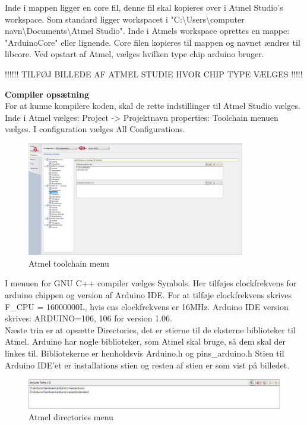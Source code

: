 Inde i mappen ligger en core fil, denne fil skal kopieres over i Atmel Studio's workspace. Som standard ligger workspacet i "C:\textbackslash Users\textbackslash computer navn\textbackslash Documents\textbackslash Atmel Studio". 
Inde i Atmels workspace oprettes en mappe: "ArduinoCore" eller lignende. Core filen kopieres til mappen og navnet ændres til libcore.
Ved opstart af Atmel, vælges hvilken type chip arduino bruger.

!!!!!! TILFØJ BILLEDE AF ATMEL STUDIE HVOR CHIP TYPE VÆLGES !!!!!

\textbf{Compiler opsætning} \\
For at kunne kompilere koden, skal de rette indstillinger til Atmel Studio vælges. 
Inde i Atmel vælges: Project -> Projektnavn properties:
Toolchain menuen vælges. I configuration vælges All Configurations.

\begin{figure}[H]
	\centering
	\includegraphics[width=0.85\textwidth]{Billeder/implementation/Howtoguide/atmel_toolchain.png}
	\caption{Atmel toolchain menu}
	\label{fig:atmel_indstillinger}
\end{figure}

I menuen for GNU C++ compiler vælges Symbols. Her tilføjes clockfrekvens for arduino chippen og version af Arduino IDE.
For at tilføje clockfrekvens skrives F\_CPU = 16000000L, hvis ens clockfrekvens er 16MHz.
Arduino IDE version skrives: ARDUINO=106, 106 for version 1.06. \\

Næste trin er at opsætte Directories, det er stierne til de eksterne biblioteker til Atmel. Arduino har nogle biblioteker, som Atmel skal bruge, så dem skal der linkes til.
Bibliotekerne er henholdsvis Arduino.h og pins\_arduino.h
Stien til Arduino IDE'et er installations stien og resten af stien er som vist på billedet.

\begin{figure}[H]
	\centering
	\includegraphics[width=1\textwidth]{Billeder/implementation/Howtoguide/atmel_directories.png}
		\caption{Atmel directories menu}
	\label{fig:atmel_directories}
\end{figure}

